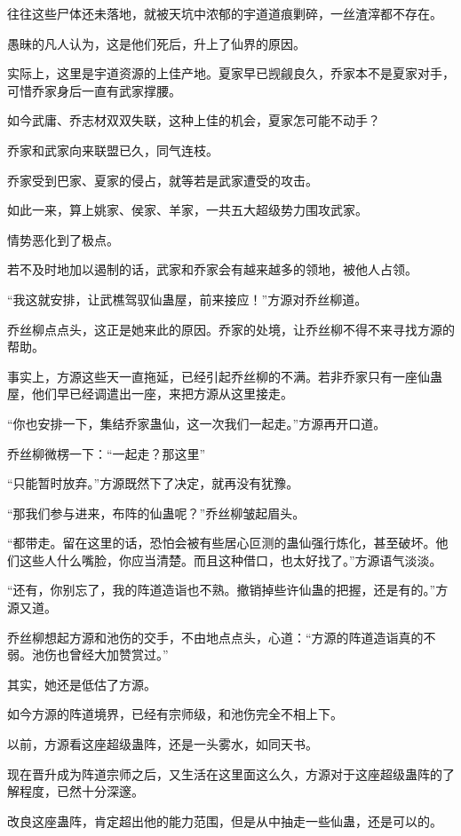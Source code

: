 \begin{this_body}
往往这些尸体还未落地，就被天坑中浓郁的宇道道痕剿碎，一丝渣滓都不存在。

愚昧的凡人认为，这是他们死后，升上了仙界的原因。

实际上，这里是宇道资源的上佳产地。夏家早已觊觎良久，乔家本不是夏家对手，可惜乔家身后一直有武家撑腰。

如今武庸、乔志材双双失联，这种上佳的机会，夏家怎可能不动手？

乔家和武家向来联盟已久，同气连枝。

乔家受到巴家、夏家的侵占，就等若是武家遭受的攻击。

如此一来，算上姚家、侯家、羊家，一共五大超级势力围攻武家。

情势恶化到了极点。

若不及时地加以遏制的话，武家和乔家会有越来越多的领地，被他人占领。

“我这就安排，让武樵驾驭仙蛊屋，前来接应！”方源对乔丝柳道。

乔丝柳点点头，这正是她来此的原因。乔家的处境，让乔丝柳不得不来寻找方源的帮助。

事实上，方源这些天一直拖延，已经引起乔丝柳的不满。若非乔家只有一座仙蛊屋，他们早已经调遣出一座，来把方源从这里接走。

“你也安排一下，集结乔家蛊仙，这一次我们一起走。”方源再开口道。

乔丝柳微楞一下：“一起走？那这里”

“只能暂时放弃。”方源既然下了决定，就再没有犹豫。

“那我们参与进来，布阵的仙蛊呢？”乔丝柳皱起眉头。

“都带走。留在这里的话，恐怕会被有些居心叵测的蛊仙强行炼化，甚至破坏。他们这些人什么嘴脸，你应当清楚。而且这种借口，也太好找了。”方源语气淡淡。

“还有，你别忘了，我的阵道造诣也不熟。撤销掉些许仙蛊的把握，还是有的。”方源又道。

乔丝柳想起方源和池伤的交手，不由地点点头，心道：“方源的阵道造诣真的不弱。池伤也曾经大加赞赏过。”

其实，她还是低估了方源。

如今方源的阵道境界，已经有宗师级，和池伤完全不相上下。

以前，方源看这座超级蛊阵，还是一头雾水，如同天书。

现在晋升成为阵道宗师之后，又生活在这里面这么久，方源对于这座超级蛊阵的了解程度，已然十分深邃。

改良这座蛊阵，肯定超出他的能力范围，但是从中抽走一些仙蛊，还是可以的。


\end{this_body}
